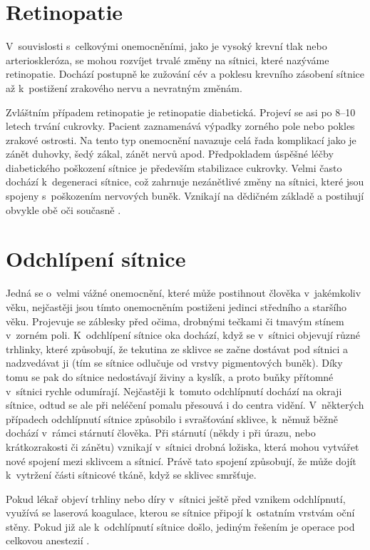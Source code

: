 \section{Retinopatie}
V~souvislosti s~celkovými onemocněními, jako je vysoký krevní tlak nebo arterioskleróza, se mohou rozvíjet trvalé změny na sítnici, které nazýváme retinopatie. Dochází postupně ke zužování cév a poklesu krevního zásobení sítnice až k~postižení zrakového nervu a nevratným změnám.  

Zvláštním případem retinopatie je retinopatie diabetická. Projeví se asi po 8--10 letech trvání cukrovky. Pacient zaznamenává výpadky zorného pole nebo pokles zrakové ostrosti. Na tento typ onemocnění navazuje celá řada komplikací jako je zánět duhovky, šedý zákal, zánět nervů apod. Předpokladem úspěšné léčby diabetického poškození sítnice je především stabilizace cukrovky. Velmi často dochází k~degeneraci sítnice, což zahrnuje nezánětlivé změny na sítnici, které jsou spojeny s~poškozením nervových buněk. Vznikají na dědičném základě a postihují obvykle obě oči současně \cite{nemoci}.


\section{Odchlípení sítnice}
Jedná se o~velmi vážné onemocnění, které může postihnout člověka v~jakémkoliv věku, nejčastěji jsou tímto onemocněním postiženi jedinci středního a staršího věku. Projevuje se záblesky před očima, drobnými tečkami či tmavým stínem v~zorném poli. K~odchlípení sítnice oka dochází, když se v~sítnici objevují různé trhlinky, které způsobují, že tekutina ze sklivce se začne dostávat pod sítnici a nadzvedávat ji (tím se sítnice odlučuje od vrstvy pigmentových buněk). Díky tomu se pak do sítnice nedostávají živiny a kyslík, a proto buňky přítomné v~sítnici rychle odumírají. Nejčastěji k~tomuto odchlípnutí dochází na okraji sítnice, odtud se ale při neléčení pomalu přesouvá i do centra vidění. V~některých případech odchlípnutí sítnice způsobilo i svrašťování sklivce, k~němuž běžně dochází v~rámci stárnutí člověka. Při stárnutí (někdy i při úrazu, nebo krátkozrakosti či zánětu) vznikají v~sítnici drobná ložiska, která mohou vytvářet nové spojení mezi sklivcem a sítnicí. Právě tato spojení způsobují, že může dojít k~vytržení části sítnicové tkáně, když se sklivec smršťuje. 

Pokud lékař objeví trhliny nebo díry v~sítnici ještě před vznikem odchlípnutí, využívá se laserová koagulace, kterou se sítnice připojí k~ostatním vrstvám oční stěny. Pokud již ale k~odchlípnutí sítnice došlo, jediným řešením je operace pod celkovou anestezií \cite{nemoci}.  


